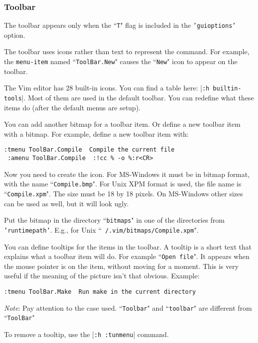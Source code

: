 \subsubsection{Toolbar}
The toolbar appears only when the ``\texttt{T}" flag is included in the \texttt{'guioptions'} option.

The toolbar uses icons rather than text to represent the command.
For example, the \texttt{{menu-item}} named ``\texttt{ToolBar.New}" causes the ``\texttt{New}" icon to appear on the toolbar.

The Vim editor has 28 built-in icons.
You can find a table here: |\texttt{:h builtin-tools}|.
Most of them are used in the default toolbar.
You can redefine what these items do (after the default menus are setup).

You can add another bitmap for a toolbar item.
Or define a new toolbar item with a bitmap.
For example, define a new toolbar item with:

\begin{Verbatim}[samepage=true]
 :tmenu ToolBar.Compile  Compile the current file
 :amenu ToolBar.Compile  :!cc % -o %:r<CR>
\end{Verbatim}

Now you need to create the icon.
For MS-Windows it must be in bitmap format, with the name ``\texttt{Compile.bmp}".
For Unix XPM format is used, the file name is ``\texttt{Compile.xpm}".
The size must be 18 by 18 pixels.
On MS-Windows other sizes can be used as well, but it will look ugly.

Put the bitmap in the directory ``\texttt{bitmaps}" in one of the directories from \texttt{'runtimepath'}.
E.g., for Unix ``\texttt{~/.vim/bitmaps/Compile.xpm}".

You can define tooltips for the items in the toolbar.
A tooltip is a short text that explains what a toolbar item will do.
For example ``\texttt{Open file}".
It appears when the mouse pointer is on the item, without moving for a moment.
This is very useful if the meaning of the picture isn't that obvious.
Example:

\begin{Verbatim}[samepage=true]
 :tmenu ToolBar.Make  Run make in the current directory
\end{Verbatim}

\emph{Note}: Pay attention to the case used.
``\texttt{Toolbar}" and ``\texttt{toolbar}" are different from ``\texttt{ToolBar}"

To remove a tooltip, use the |\texttt{:h :tunmenu}| command.

